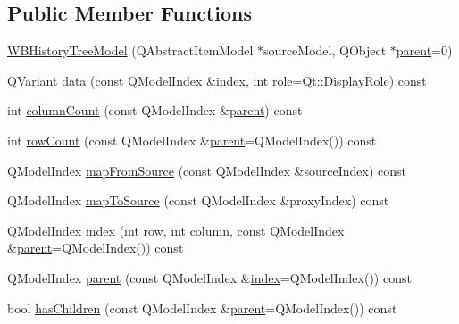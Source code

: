 \subsection*{Public Member Functions}
\begin{DoxyCompactItemize}
\item 
\hyperlink{class_w_b_history_tree_model_a8a75583d7989d8a930d683beda3f1a12}{W\-B\-History\-Tree\-Model} (Q\-Abstract\-Item\-Model $\ast$source\-Model, Q\-Object $\ast$\hyperlink{class_w_b_history_tree_model_a89c9b830b439c0c9f93d0d8368705171}{parent}=0)
\item 
Q\-Variant \hyperlink{class_w_b_history_tree_model_af10a03519546e5217dd49236605a0098}{data} (const Q\-Model\-Index \&\hyperlink{class_w_b_history_tree_model_abaff08dce3fe3a17296825854001bc44}{index}, int role=Qt\-::\-Display\-Role) const 
\item 
int \hyperlink{class_w_b_history_tree_model_a7fdeda2fc11b465e1c6811d6c6df7eeb}{column\-Count} (const Q\-Model\-Index \&\hyperlink{class_w_b_history_tree_model_a89c9b830b439c0c9f93d0d8368705171}{parent}) const 
\item 
int \hyperlink{class_w_b_history_tree_model_ac5cf4ae4eedb64e2240158fc8f92a7b9}{row\-Count} (const Q\-Model\-Index \&\hyperlink{class_w_b_history_tree_model_a89c9b830b439c0c9f93d0d8368705171}{parent}=Q\-Model\-Index()) const 
\item 
Q\-Model\-Index \hyperlink{class_w_b_history_tree_model_a542b024a863331e31103f9ebfd193d45}{map\-From\-Source} (const Q\-Model\-Index \&source\-Index) const 
\item 
Q\-Model\-Index \hyperlink{class_w_b_history_tree_model_ad3cb7e5007ff5f81e5857fb539026aea}{map\-To\-Source} (const Q\-Model\-Index \&proxy\-Index) const 
\item 
Q\-Model\-Index \hyperlink{class_w_b_history_tree_model_abaff08dce3fe3a17296825854001bc44}{index} (int row, int column, const Q\-Model\-Index \&\hyperlink{class_w_b_history_tree_model_a89c9b830b439c0c9f93d0d8368705171}{parent}=Q\-Model\-Index()) const 
\item 
Q\-Model\-Index \hyperlink{class_w_b_history_tree_model_a89c9b830b439c0c9f93d0d8368705171}{parent} (const Q\-Model\-Index \&\hyperlink{class_w_b_history_tree_model_abaff08dce3fe3a17296825854001bc44}{index}=Q\-Model\-Index()) const 
\item 
bool \hyperlink{class_w_b_history_tree_model_a38f8b68b027d704ee57a48ceb9882ea2}{has\-Children} (const Q\-Model\-Index \&\hyperlink{class_w_b_history_tree_model_a89c9b830b439c0c9f93d0d8368705171}{parent}=Q\-Model\-Index()) const 

\end{DoxyCompactItemize}
